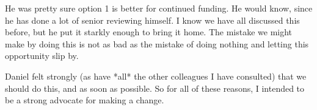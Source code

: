 \documentclass[aps,prd,superscriptaddress,showpacs,nofootinbib,fixlfloat, 12pt]{revtex4-1}
\begin{document}
He was pretty sure option 1 is better for continued funding.  He would
know, since he has done a lot of senior reviewing himself.  I know we
have all discussed this before, but he put it starkly enough to bring
it home.  The mistake we might make by doing this is not as bad as the
mistake of doing nothing and letting this opportunity slip by.

Daniel felt strongly (as have *all* the other colleagues I have
consulted) that we should do this, and as soon as possible.  So for
all of these reasons, I intended to be a strong advocate for making a
change.



\clearpage

\end{document}
